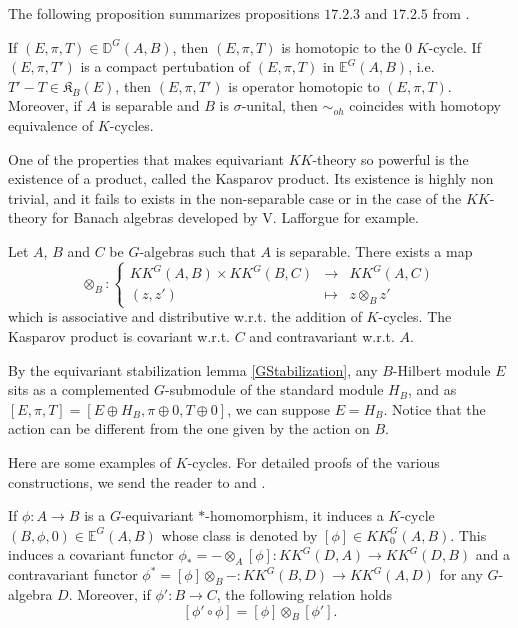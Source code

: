 The following proposition summarizes propositions $17.2.3$ and $17.2.5$ from \cite{blackadar}. 
 
\begin{prop} If $(E,\pi,T)\in\mathbb D^G(A,B)$, then $(E,\pi,T)$ is homotopic to the $0$ $K$-cycle.
If $(E,\pi,T')$ is a compact pertubation of $(E,\pi,T)$ in $\mathbb E^G(A,B)$, i.e. $T'-T\in \mathfrak K_B(E)$, then $(E,\pi,T')$ is operator homotopic to $(E,\pi,T)$.\\
Moreover, if $A$ is separable and $B$ is $\sigma$-unital, then $\sim_{oh}$ coincides with homotopy equivalence of $K$-cycles.
\end{prop}

One of the properties that makes equivariant $KK$-theory so powerful is the existence of a product, called the Kasparov product. Its existence is highly non trivial, and it fails to exists in the non-separable case or in the case of the $KK$-theory for Banach algebras developed by V. Lafforgue \cite{Lafforgue} for example.

\begin{prop}\cite{LeGall} Let $A$, $B$ and $C$ be $G$-algebras such that $A$ is separable. There exists a map 
\[\otimes_B :\left\{\begin{array}{ccc} KK^G(A,B)\times KK^G(B,C) & \rightarrow & KK^G(A,C) \\ (z,z') & \mapsto & z\otimes_B z' \end{array}\right. \]
which is associative and distributive w.r.t. the addition of $K$-cycles. The Kasparov product is covariant w.r.t. $C$ and contravariant w.r.t. $A$.
\end{prop}

\begin{rk}
By the equivariant stabilization lemma \ref{GStabilization}, any $B$-Hilbert module $E$ sits as a complemented $G$-submodule of the standard module $H_B$, and as $[E,\pi,T] = [E \oplus H_B,\pi\oplus 0,T\oplus 0]$, we can suppose $E = H_B$. Notice that the action can be different from the one given by the action on $B$. 
\end{rk}

Here are some examples of $K$-cycles. For detailed proofs of the various constructions, we send the reader to \cite{blackadar} and \cite{LeGall}.

\begin{Expl}
If $\phi : A\rightarrow B$ is a $G$-equivariant $*$-homomorphism, it induces a $K$-cycle $(B,\phi,0)\in \mathbb E^G(A,B)$ whose class is denoted by $[\phi]\in KK_0^G(A,B)$. This induces a covariant functor $\phi_* = - \otimes_A [\phi] : KK^G(D,A)\rightarrow KK^G(D,B)$ and a contravariant functor $\phi^*=  [\phi] \otimes_B - : KK^G(B,D)\rightarrow KK^G(A,D)$ for any $G$-algebra $D$. Moreover, if $\phi' : B\rightarrow C$, the following relation holds 
\[ [\phi'\circ \phi] = [\phi]\otimes_B [\phi'].\]
\end{Expl}

